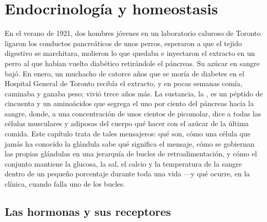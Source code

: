 \chapter{Endocrinología y homeostasis}\label{ch:b3:endocrinology}

En el verano de 1921, dos hombres jóvenes en un laboratorio caluroso de
Toronto ligaron los conductos pancreáticos de unos perros, esperaron a
que el tejido digestivo se marchitara, molieron lo que quedaba e
inyectaron el extracto en un perro al que habían vuelto diabético
retirándole el páncreas. Su azúcar en sangre bajó. En enero, un
muchacho de catorce años que se moría de diabetes en el Hospital
General de Toronto recibía el extracto, y en pocas semanas comía,
caminaba y ganaba peso; vivió trece años más. La sustancia, la
, es un péptido de cincuenta y un aminoácidos que segrega el
uno por ciento del páncreas hacia la sangre, donde, a una
concentración de unos cientos de picomolar, dice a todas las células
musculares y adiposas del cuerpo qué hacer con el azúcar de la última
comida. Este capítulo trata de tales mensajeros: qué son, cómo una
célula que jamás ha conocido la glándula sabe qué significa el mensaje,
cómo se gobiernan las propias glándulas en una jerarquía de bucles de
retroalimentación, y cómo el conjunto mantiene la glucosa, la sal, el
calcio y la temperatura de la sangre dentro de un pequeño porcentaje
durante toda una vida ---y qué ocurre, en la clínica, cuando falla uno
de los bucles.

\section{Las hormonas y sus receptores}

